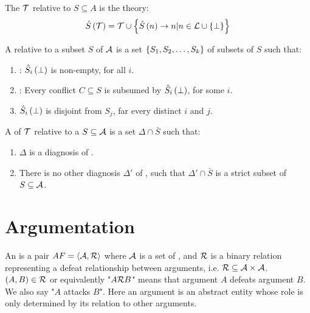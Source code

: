 \begin{defi}
The  $\mathcal{T}$ relative to $S\subseteq A$ is the theory:
\begin{equation}
\hat{S}\left(\mathcal{T}\right)=\mathcal{T}\cup\left\{ \hat{S}\left(n\right)\rightarrow n|n\in\mathcal{L}\cup\left\{ \bot\right\}\right\}
\end{equation}
\cite{conf/ijcai/RaimanKS93}
\end{defi}

\begin{defi}
A  relative to a subset $S$ of $\mathcal{A}$ is a set $\left\{ S_1,S_2,\ldots,S_k\right\}$ of subsets of $S$ such that:
\begin{enumerate}
 \item {}: $\hat{S}_i\left(\bot\right)$ is non-empty, for all $i$.
 \item {}: Every conflict $C\subseteq S$ is subsumed by $\hat{S}_i\left(\bot\right)$, for some $i$.
 \item {} $\hat{S}_i\left(\bot\right)$ is disjoint from $S_j$, far every distinct $i$ and $j$.
\end{enumerate}
\cite{conf/ijcai/RaimanKS93}
\end{defi}

\begin{defi} A  of $\mathcal{T}$ relative to a $S\subseteq\mathcal{A}$ is a set $\Delta\cap\bar{S}$ such that:
\begin{enumerate}
 \item $\Delta$ is a diagnosis of .
 \item There is no other diagnosis $\Delta'$ of , such that $\Delta'\cap\bar{S}$ is a strict subset of $S\subseteq\mathcal{A}$.
\end{enumerate}
\cite{conf/ijcai/RaimanKS93}
\end{defi}

\section{Argumentation}

\begin{defi}
An  is a pair $AF=\left\langle \mathcal{A},\mathcal{R}\right\rangle$ where $\mathcal{A}$ is a set of , and $\mathcal{R}$ is a binary relation representing a defeat relationship between arguments, i.e. $\mathcal{R}\subseteq\mathcal{A}\times\mathcal{A}$. $\left( A,B\right)\in\mathcal{R}$ or equivalently "$A\mathcal{R} B$" means that argument $A$ defeats argument $B$. We also say "$A$ attacks $B$". Here an argument is an abstract entity whose role is only determined by its relation to other arguments.
\cite{conf/ijcai/Dung93}
\end{defi}

